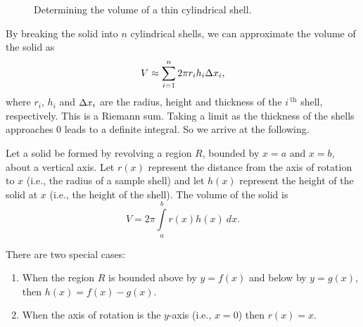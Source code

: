 \begin{figure}[h]
\centering
\qquad
{}
\caption{Determining the volume of a thin cylindrical shell.}
\end{figure}



By breaking the solid into $n$ cylindrical shells, we can approximate the volume of the solid as
$$V \approx \sum_{i=1}^n 2\pi r_ih_i\Delta x_i,$$ where $r_i$, $h_i$ and $\Delta x_i$ are the radius, height and thickness of the $i\,^\text{th}$ shell, respectively. 
This is a Riemann sum. Taking a limit as the thickness of the shells approaches 0 leads to a definite integral.  So we arrive at the following. 

Let a solid be formed by revolving a region $R$, bounded by $x=a$ and $x=b$, about a vertical axis. Let $r(x)$ represent the distance from the axis of rotation to $x$ (i.e., the radius of a sample shell) and let $h(x)$ represent the height of the solid at $x$ (i.e., the height of the shell). The volume of the solid is 
\begin{equation}
V = 2\pi\int\limits_a^b r(x)h(x)\ dx.
\end{equation}

There are two special cases:
	\begin{enumerate}
	\item		When the region $R$ is bounded above by $y=f(x)$ and below by $y=g(x)$, then $h(x) = f(x)-g(x)$.
	\item		When the axis of rotation is the $y$-axis (i.e., $x=0$) then $r(x) = x$.
	\end{enumerate}
	
